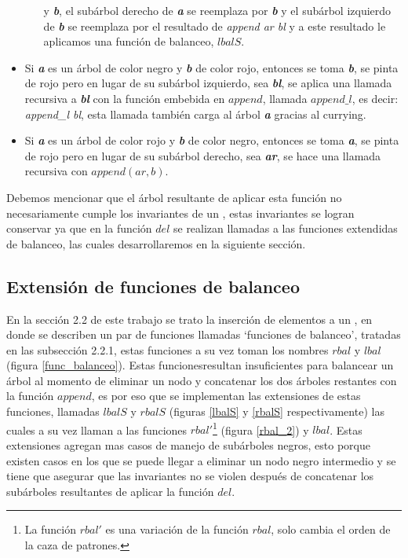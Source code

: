 \begin{itemize}
\begin{itemize}
      y \textbf{\textit{b}}, el subárbol derecho de \textbf{\textit{a}} se reemplaza por \textbf{\textit{b}} y el subárbol izquierdo de \textbf{\textit{b}} se
      reemplaza por el resultado de \textit{append ar bl} y a este resultado le aplicamos una
      función de balanceo, $lbalS$.
    \end{itemize}
    \item Si \textbf{\textit{a}} es un \'arbol de color negro y \textbf{\textit{b}} de color rojo, entonces se toma \textbf{\textit{b}}, se pinta
    de rojo pero en lugar de su subárbol izquierdo, sea \textbf{\textit{bl}}, se aplica una llamada recursiva a
    \textbf{\textit{bl}} con la funci\'on embebida en $append$, llamada $append\_l$, es decir: \textit{append\_l
    bl}, esta llamada tambi\'en carga al \'arbol \textbf{\textit{a}} gracias al currying\cite{Currying}.
    \item Si \textbf{\textit{a}} es un \'arbol de color rojo y \textbf{\textit{b}} de color negro, entonces se toma \textbf{\textit{a}}, se pinta
    de rojo pero en lugar de su subárbol derecho, sea \textbf{\textit{ar}}, se hace una llamada recursiva con
    $append(ar,b)$.
\end{itemize}

Debemos mencionar que el \'arbol resultante de aplicar esta funci\'on no necesariamente cumple los
invariantes de un {\arn}, estas invariantes se logran conservar ya que en la funci\'on $del$ se
realizan llamadas a las funciones extendidas de balanceo, las cuales desarrollaremos en la
siguiente sección.

\subsection{Extensi\'on de funciones de balanceo}

En la secci\'on 2.2 de este trabajo se trato la inserci\'on de elementos a un {\arn}, en donde se
describen un par de funciones llamadas `funciones de balanceo', tratadas en las subsecci\'on
2.2.1, estas funciones a su vez toman los nombres $rbal$ y $lbal$ (figura \ref{func_balanceo}).
Estas funcionesresultan insuficientes para balancear un \'arbol al momento de eliminar un nodo y
concatenar los dos \'arboles restantes con la función $append$, es por eso que se implementan las
extensiones de estas funciones, llamadas $lbalS$ y $rbalS$ (figuras \ref{lbalS} y \ref{rbalS}
respectivamente) las cuales a su vez llaman a las funciones $rbal'$\footnote{La funci\'on $rbal'$
es una variación de la función $rbal$, solo cambia el orden de la caza de patrones.} (figura
\ref{rbal_2}) y $lbal$. Estas extensiones agregan mas casos de manejo de subárboles negros, esto
porque existen casos en los que se puede llegar a eliminar un nodo negro intermedio y se tiene que
asegurar que las invariantes no se violen después de concatenar los subárboles resultantes de
aplicar la función $del$.

